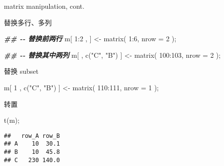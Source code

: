 \documentclass[ignorenonframetext,]{beamer}
\newenvironment{Shaded}{\begin{snugshade}}{\end{snugshade}}
\newcommand{\AttributeTok}[1]{\textcolor[rgb]{0.77,0.63,0.00}{#1}}
\newcommand{\DecValTok}[1]{\textcolor[rgb]{0.00,0.00,0.81}{#1}}
\newcommand{\DocumentationTok}[1]{\textcolor[rgb]{0.56,0.35,0.01}{\textbf{\textit{#1}}}}
\newcommand{\FunctionTok}[1]{\textcolor[rgb]{0.00,0.00,0.00}{#1}}
\newcommand{\NormalTok}[1]{#1}
\newcommand{\OtherTok}[1]{\textcolor[rgb]{0.56,0.35,0.01}{#1}}
\newcommand{\SpecialCharTok}[1]{\textcolor[rgb]{0.00,0.00,0.00}{#1}}
\newcommand{\StringTok}[1]{\textcolor[rgb]{0.31,0.60,0.02}{#1}}
\newcommand\FontSmall{\fontsize{7}{8}\selectfont}
\begin{document}
\begin{frame}[fragile]{matrix manipulation, cont.}
\protect\hypertarget{matrix-manipulation-cont.-5}{}
\begin{block}{替换多行、多列}
\protect\hypertarget{ux66ffux6362ux591aux884cux591aux5217}{}
\FontSmall

\begin{Shaded}
\begin{Highlighting}[]
\DocumentationTok{\#\# {-}{-} 替换前两行}
\NormalTok{m[ }\DecValTok{1}\SpecialCharTok{:}\DecValTok{2}\NormalTok{ , ] }\OtherTok{\textless{}{-}} \FunctionTok{matrix}\NormalTok{(  }\DecValTok{1}\SpecialCharTok{:}\DecValTok{6}\NormalTok{, }\AttributeTok{nrow =} \DecValTok{2}\NormalTok{ );}

\DocumentationTok{\#\# {-}{-} 替换其中两列}
\NormalTok{m[  , }\FunctionTok{c}\NormalTok{(}\StringTok{"C"}\NormalTok{, }\StringTok{"B"}\NormalTok{) ] }\OtherTok{\textless{}{-}} \FunctionTok{matrix}\NormalTok{(  }\DecValTok{100}\SpecialCharTok{:}\DecValTok{103}\NormalTok{, }\AttributeTok{nrow =} \DecValTok{2}\NormalTok{ );}
\end{Highlighting}
\end{Shaded}
\end{block}

\begin{block}{替换 subset}
\protect\hypertarget{ux66ffux6362-subset}{}
\FontSmall

\begin{Shaded}
\begin{Highlighting}[]
\NormalTok{m[ }\DecValTok{1}\NormalTok{  , }\FunctionTok{c}\NormalTok{(}\StringTok{"C"}\NormalTok{, }\StringTok{"B"}\NormalTok{) ] }\OtherTok{\textless{}{-}} \FunctionTok{matrix}\NormalTok{(  }\DecValTok{110}\SpecialCharTok{:}\DecValTok{111}\NormalTok{, }\AttributeTok{nrow =} \DecValTok{1}\NormalTok{ );}
\end{Highlighting}
\end{Shaded}
\end{block}

\begin{block}{转置}
\protect\hypertarget{ux8f6cux7f6e}{}
\FontSmall

\begin{Shaded}
\begin{Highlighting}[]
\FunctionTok{t}\NormalTok{(m);}
\end{Highlighting}
\end{Shaded}

\begin{verbatim}
##   row_A row_B
## A    10  30.1
## B    10  45.8
## C   230 140.0
\end{verbatim}
\end{block}
\end{frame}
\end{document}
